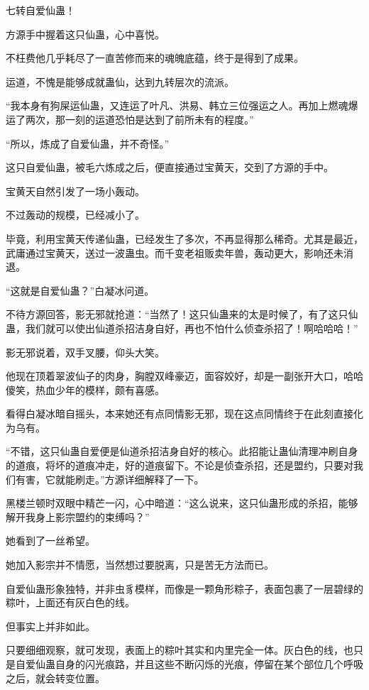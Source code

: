 
\begin{this_body}

七转自爱仙蛊！

方源手中握着这只仙蛊，心中喜悦。

不枉费他几乎耗尽了一直苦修而来的魂魄底蕴，终于是得到了成果。

运道，不愧是能够成就蛊仙，达到九转层次的流派。

“我本身有狗屎运仙蛊，又连运了叶凡、洪易、韩立三位强运之人。再加上燃魂爆运了两次，那一刻的运道恐怕是达到了前所未有的程度。”

“所以，炼成了自爱仙蛊，并不奇怪。”

这只自爱仙蛊，被毛六炼成之后，便直接通过宝黄天，交到了方源的手中。

宝黄天自然引发了一场小轰动。

不过轰动的规模，已经减小了。

毕竟，利用宝黄天传递仙蛊，已经发生了多次，不再显得那么稀奇。尤其是最近，武庸通过宝黄天，送过一波蛊虫。而千变老祖贩卖年兽，轰动更大，影响还未消退。

“这就是自爱仙蛊？”白凝冰问道。

不待方源回答，影无邪就抢道：“当然了！这只仙蛊来的太是时候了，有了这只仙蛊，我们就可以使出仙道杀招洁身自好，再也不怕什么侦查杀招了！啊哈哈哈！”

影无邪说着，双手叉腰，仰头大笑。

他现在顶着翠波仙子的肉身，胸膛双峰豪迈，面容姣好，却是一副张开大口，哈哈傻笑，热血少年的模样，颇有喜感。

看得白凝冰暗自摇头，本来她还有点同情影无邪，现在这点同情终于在此刻直接化为乌有。

“不错，这只仙蛊自爱便是仙道杀招洁身自好的核心。此招能让蛊仙清理冲刷自身的道痕，将坏的道痕冲走，好的道痕留下。不论是侦查杀招，还是盟约，只要对我们有害，它就能刷走。”方源详细解释了一下。

黑楼兰顿时双眼中精芒一闪，心中暗道：“这么说来，这只仙蛊形成的杀招，能够解开我身上影宗盟约的束缚吗？”

她看到了一丝希望。

她加入影宗并不情愿，当然想过要脱离，只是苦无方法而已。

自爱仙蛊形象独特，并非虫豸模样，而像是一颗角形粽子，表面包裹了一层碧绿的粽叶，上面还有灰白色的线。

但事实上并非如此。

只要细细观察，就可发现，表面上的粽叶其实和内里完全一体。灰白色的线，也只是自爱仙蛊自身的闪光痕路，并且这些不断闪烁的光痕，停留在某个部位几个呼吸之后，就会转变位置。


\end{this_body}
